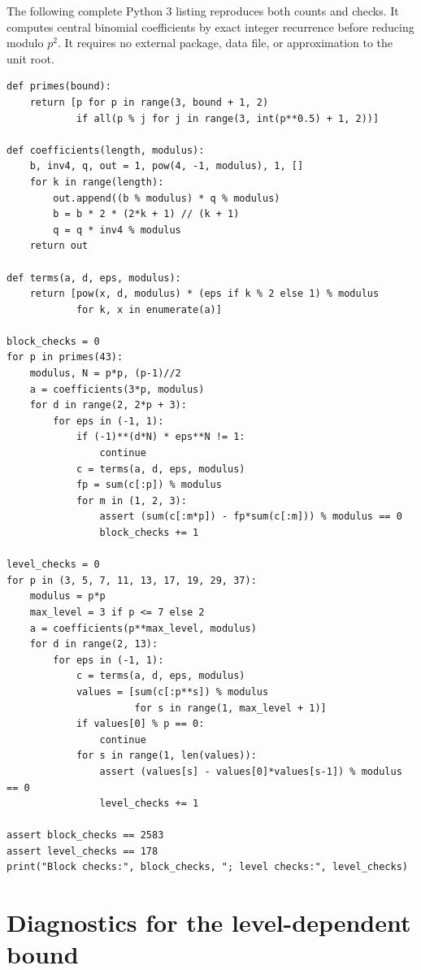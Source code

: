 \documentclass[11pt,letterpaper]{article}
\theoremstyle{definition}
\theoremstyle{remark}
\begin{document}
The following complete Python 3 listing reproduces both counts and
checks.  It computes central binomial coefficients by exact integer
recurrence before reducing modulo $p^2$.  It requires no external
package, data file, or approximation to the unit root.

\begin{lstlisting}
def primes(bound):
    return [p for p in range(3, bound + 1, 2)
            if all(p % j for j in range(3, int(p**0.5) + 1, 2))]

def coefficients(length, modulus):
    b, inv4, q, out = 1, pow(4, -1, modulus), 1, []
    for k in range(length):
        out.append((b % modulus) * q % modulus)
        b = b * 2 * (2*k + 1) // (k + 1)
        q = q * inv4 % modulus
    return out

def terms(a, d, eps, modulus):
    return [pow(x, d, modulus) * (eps if k % 2 else 1) % modulus
            for k, x in enumerate(a)]

block_checks = 0
for p in primes(43):
    modulus, N = p*p, (p-1)//2
    a = coefficients(3*p, modulus)
    for d in range(2, 2*p + 3):
        for eps in (-1, 1):
            if (-1)**(d*N) * eps**N != 1:
                continue
            c = terms(a, d, eps, modulus)
            fp = sum(c[:p]) % modulus
            for m in (1, 2, 3):
                assert (sum(c[:m*p]) - fp*sum(c[:m])) % modulus == 0
                block_checks += 1

level_checks = 0
for p in (3, 5, 7, 11, 13, 17, 19, 29, 37):
    modulus = p*p
    max_level = 3 if p <= 7 else 2
    a = coefficients(p**max_level, modulus)
    for d in range(2, 13):
        for eps in (-1, 1):
            c = terms(a, d, eps, modulus)
            values = [sum(c[:p**s]) % modulus
                      for s in range(1, max_level + 1)]
            if values[0] % p == 0:
                continue
            for s in range(1, len(values)):
                assert (values[s] - values[0]*values[s-1]) % modulus == 0
                level_checks += 1

assert block_checks == 2583
assert level_checks == 178
print("Block checks:", block_checks, "; level checks:", level_checks)
\end{lstlisting}


\section{Diagnostics for the level-dependent bound}
\end{document}
